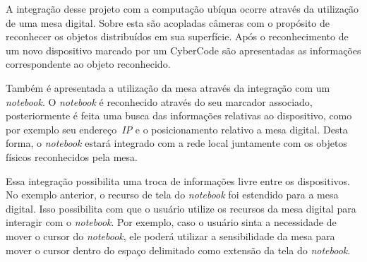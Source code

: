 	A integração desse projeto com a computação ubíqua ocorre através da utilização de uma mesa
	digital. Sobre esta são acopladas câmeras com o propósito de reconhecer os objetos
	distribuídos em sua superfície. Após o reconhecimento de um novo dispositivo marcado por um
	CyberCode são apresentadas as informações correspondente ao objeto reconhecido. 
	
	Também é apresentada a utilização da mesa através da integração com um \textit{notebook}. O
	\textit{notebook} é reconhecido através do seu marcador associado, posteriormente é feita uma busca
	das informações relativas ao dispositivo, como por exemplo seu endereço~\textit{IP} e o
	posicionamento relativo a mesa digital. Desta forma, o \textit{notebook} estará integrado com a
	rede local juntamente com os objetos físicos reconhecidos pela mesa.
	
	Essa integração possibilita uma troca de informações livre entre os dispositivos. No exemplo
	anterior, o recurso de tela do \textit{notebook} foi estendido para a mesa digital. Isso
	possibilita com que o usuário utilize os recursos da mesa digital para interagir com o
	\textit{notebook}. Por exemplo, caso o usuário sinta a necessidade de mover o cursor do
	\textit{notebook}, ele poderá utilizar a sensibilidade da mesa para mover o cursor dentro do espaço
	delimitado como extensão da tela do \textit{notebook}.
	
